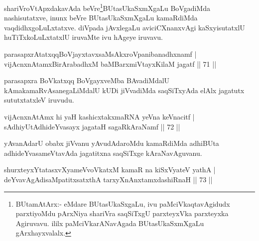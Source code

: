 \begin{artha}
shariVroVtApxdakavAda beVre\footnote{BUtamAtArx:- eMdare BUtasUkaSxgaLu, ivu paMciVkaqtavAgidudx parxtiyoMdu pArxNiya shariVra saqSiTxgU parxteyxVka parxteyxka Agiruvavu. ililx  paMciVkarANavAgada BUtasUkaSxmXgaLu gArxhayxvalalx.}BUtasUkaSxmXgaLu BoVgadiMda nashisutatxve, inunx beVre BUtasUkaSxmXgaLu kamaRdiMda vaqdidhxgoLuLxtatxve. diVpada jAvxlegaLu aviciCXnanxvAgi kaSxyisutatxlU huTiTxkoLuLxtatxlU iruvaMte ivu hAgeye iruvavu.
\end{artha}

\begin{shl}
parasapxrAtatxqqBoVjayxtavxsaMsAkxroVpanibanadhxnamf |\\
vijAcnxnAtamxBirArabadhxM baMBarxmiVtayxKilaM jagatf \hfill || 71 ||
\end{shl}

\begin{artha}
parasapxra BoVkatxqq BoVgayxveMba BAvadiMdalU kAmakamaRvAsanegaLiMdalU kUDi jiVvadiMda saqSiTxyAda elAlx jagatutx sututxtatxleV iruvudu.
\end{artha}


\begin{shl}
vijAcnxnAtAmx hi yaH kashicxtakxmaRNA yeVna keVnacitf |\\
sAdhiyUtAdhideYvasayx jagataH sagaRkAraNamf \hfill || 72 ||
\end{shl}

\begin{artha}
yAvanAdarU obabx jiVvanu yAvudAdaroMdu kamaRdiMda adhiBUta adhideYvasameVtavAda jagatitxna saqSiTxge kAraNavAguvanu.
\end{artha}

\begin{shl}
shurxteyxYtatasxvXyameVvoVkatxM kamaR na kiSxVyateV yathA |\\
\footnotemark{}deYvavAgAdisaMpatitxsatxthA tarxyXnAnxtamxdashiRnaH \hfill || 73 ||
\end{shl}

